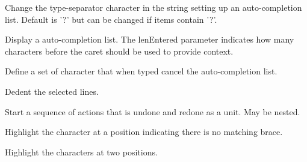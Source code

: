 \label{wxstyledtextctrlautocompsettypeseparator}


Change the type-separator character in the string setting up an auto-completion list.
Default is '?' but can be changed if items contain '?'.


\label{wxstyledtextctrlautocompshow}


Display a auto-completion list.
The lenEntered parameter indicates how many characters before
the caret should be used to provide context.


\label{wxstyledtextctrlautocompstops}


Define a set of character that when typed cancel the auto-completion list.


\label{wxstyledtextctrlbacktab}


Dedent the selected lines.


\label{wxstyledtextctrlbeginundoaction}


Start a sequence of actions that is undone and redone as a unit.
May be nested.


\label{wxstyledtextctrlbracebadlight}


Highlight the character at a position indicating there is no matching brace.


\label{wxstyledtextctrlbracehighlight}


Highlight the characters at two positions.


\label{wxstyledtextctrlbracematch}


